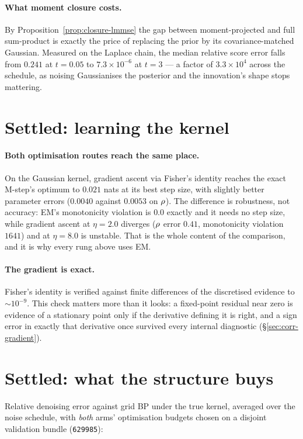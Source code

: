 \paragraph{What moment closure costs.} By Proposition~\ref{prop:closure-lmmse} the gap between
moment-projected and full sum-product is exactly the price of replacing the prior by its
covariance-matched Gaussian. Measured on the Laplace chain, the median relative score error falls
from $0.241$ at $t=0.05$ to $7.3\times10^{-6}$ at $t=3$ --- a factor of $3.3\times10^{4}$ across
the schedule, as noising Gaussianises the posterior and the innovation's shape stops mattering.

\section{Settled: learning the kernel}

\paragraph{Both optimisation routes reach the same place.} On the Gaussian kernel, gradient
ascent via Fisher's identity reaches the exact M-step's optimum to $0.021$ nats at its best step
size, with slightly better parameter errors ($0.0040$ against $0.0053$ on $\rho$). The
difference is robustness, not accuracy: EM's monotonicity violation is $0.0$ exactly and it needs
no step size, while gradient ascent at $\eta=2.0$ diverges ($\rho$ error $0.41$, monotonicity
violation $1641$) and at $\eta=8.0$ is unstable. That is the whole content of the comparison, and
it is why every rung above uses EM.

\paragraph{The gradient is exact.} Fisher's identity is verified against finite differences of
the discretised evidence to ${\sim}10^{-9}$. This check matters more than it looks: a fixed-point
residual near zero is evidence of a stationary point only if the derivative defining it is right,
and a sign error in exactly that derivative once survived every internal diagnostic
(\S\ref{sec:corr-gradient}).

\section{Settled: what the structure buys}
\label{sec:rec-efficiency}

Relative denoising error against grid BP under the true kernel, averaged over the noise schedule,
with \emph{both} arms' optimisation budgets chosen on a disjoint validation bundle
(\texttt{629985}):

